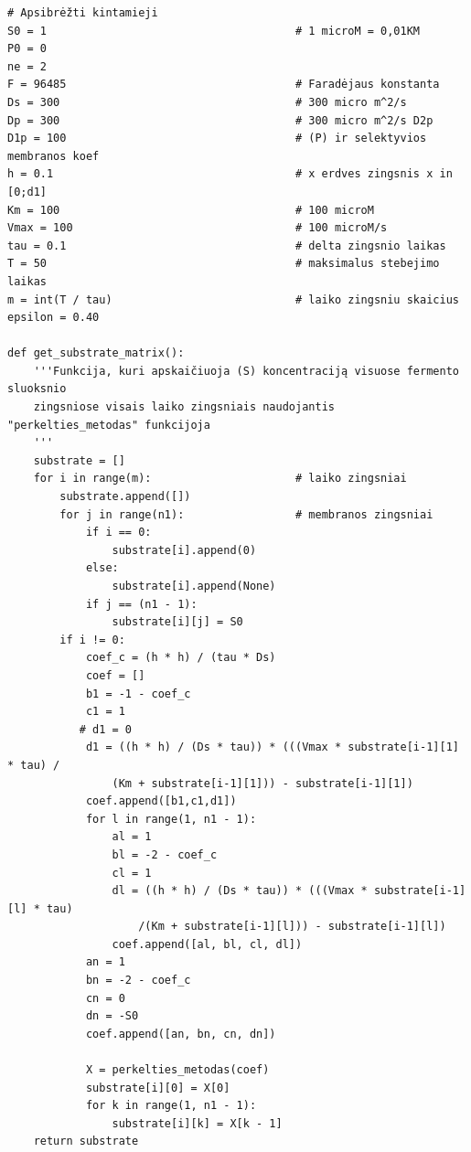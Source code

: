 \documentclass[12pt, a4paper, lithuanian]{article}
\begin{document}
\begin{verbatim}
# Apsibrėžti kintamieji    
S0 = 1                                      # 1 microM = 0,01KM
P0 = 0 
ne = 2
F = 96485                                   # Faradėjaus konstanta
Ds = 300                                    # 300 micro m^2/s
Dp = 300                                    # 300 micro m^2/s D2p
D1p = 100                                   # (P) ir selektyvios membranos koef
h = 0.1                                     # x erdves zingsnis x in [0;d1]
Km = 100                                    # 100 microM
Vmax = 100                                  # 100 microM/s
tau = 0.1                                   # delta zingsnio laikas
T = 50                                      # maksimalus stebejimo laikas
m = int(T / tau)                            # laiko zingsniu skaicius
epsilon = 0.40

def get_substrate_matrix():
    '''Funkcija, kuri apskaičiuoja (S) koncentraciją visuose fermento sluoksnio
    zingsniose visais laiko zingsniais naudojantis "perkelties_metodas" funkcijoja
    '''
    substrate = []
    for i in range(m):                      # laiko zingsniai
        substrate.append([])
        for j in range(n1):                 # membranos zingsniai
            if i == 0:
                substrate[i].append(0)
            else:
                substrate[i].append(None)
            if j == (n1 - 1):
                substrate[i][j] = S0
        if i != 0:
            coef_c = (h * h) / (tau * Ds)
            coef = []
            b1 = -1 - coef_c
            c1 = 1
           # d1 = 0
            d1 = ((h * h) / (Ds * tau)) * (((Vmax * substrate[i-1][1] * tau) / 
                (Km + substrate[i-1][1])) - substrate[i-1][1])
            coef.append([b1,c1,d1])
            for l in range(1, n1 - 1):
                al = 1
                bl = -2 - coef_c
                cl = 1
                dl = ((h * h) / (Ds * tau)) * (((Vmax * substrate[i-1][l] * tau)
                    /(Km + substrate[i-1][l])) - substrate[i-1][l])
                coef.append([al, bl, cl, dl])
            an = 1
            bn = -2 - coef_c
            cn = 0
            dn = -S0
            coef.append([an, bn, cn, dn])

            X = perkelties_metodas(coef)
            substrate[i][0] = X[0]
            for k in range(1, n1 - 1):
                substrate[i][k] = X[k - 1]
    return substrate


\end{verbatim}
\end{document}
